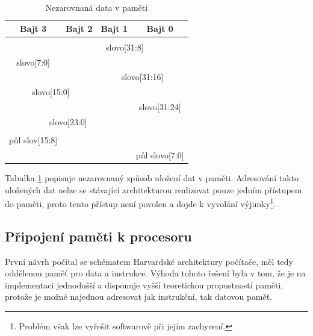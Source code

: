 \documentclass[FM,BP]{tulthesis}
\begin{document}
\begin{table}[h]
    \caption{Nezarovnaná data v paměti}
    \label{table:nezarovnana pamet}
    \begin{center}
        \begin{tabular}{|p{2cm}p{2cm}p{2cm}p{2cm}|}
        \hline
        \multicolumn{1}{|c|}{\textbf{Bajt 3}} & 
        \multicolumn{1}{c|}{\textbf{Bajt 2}} &
        \multicolumn{1}{c|}{\textbf{Bajt 1}} &
        \multicolumn{1}{c|}{\textbf{Bajt 0}} 
        \\
        \hline
        &&& \\
        \cline{2-4}
        & \multicolumn{3}{|c|}{slovo[31:8]}\\
        \hline
        \multicolumn{1}{|c|}{slovo[7:0]} & \multicolumn{3}{c|}{} \\
        \cline{0-0}
        
        \cline{3-4}
        \multicolumn{2}{|c|}{} & \multicolumn{2}{c|}{slovo[31:16]}\\
        \hline
        \multicolumn{2}{|c|}{slovo[15:0]} & \multicolumn{2}{c|}{}\\
        \cline{0-1}

        \cline{4-4}
        \multicolumn{3}{|c|}{} & \multicolumn{1}{c|}{slovo[31:24]}\\
        \hline
        \multicolumn{3}{|c|}{slovo[23:0]} & \multicolumn{1}{c|}{}\\
        \cline{0-2}
        
        \multicolumn{4}{|c|}{}\\
        \cline{0-0}
        \multicolumn{1}{|c|}{půl slov[15:8]} & \multicolumn{3}{c|}{} \\
        \cline{0-0}
        \cline{4-4}
        \multicolumn{3}{|c|}{} & \multicolumn{1}{c|}{půl slovo[7:0]} \\
        \hline
        \end{tabular}
    \end{center}
\end{table}

Tabulka \ref{table:nezarovnana pamet} popisuje nezarovnaný způsob uložení dat v paměti. Adresování takto uložených dat nelze se stávající architekturou realizovat pouze jedním přístupem do paměti, proto tento přístup není povolen a dojde k vyvolání výjimky\footnote{Problém však lze vyřešit softwarově při jejím zachycení.}.


\subsection{Připojení paměti k procesoru} \label{kap:Připojení paměti k procesoru}
První návrh počítal se schématem Harvardské architektury počítače, měl tedy oddělenou paměť pro data a instrukce. Výhoda tohoto řešení byla v tom, že je na implementaci jednodušší a disponuje vyšší teoretickou propustností paměti, protože je možné najednou adresovat jak instrukční, tak datovou paměť.  
\end{document}
